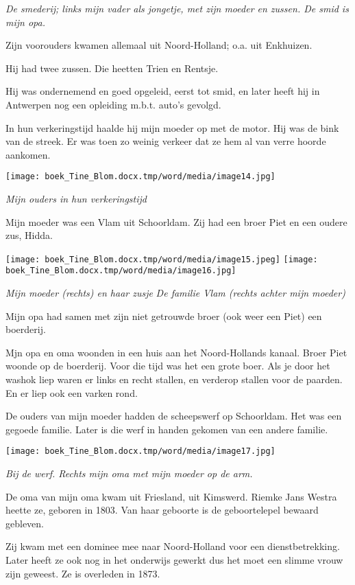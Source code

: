 \documentclass{scrbook}
\begin{document}
\textit{De smederij; links mijn vader als jongetje, met zijn moeder en zussen. De smid is mijn opa.}

Zijn voorouders kwamen allemaal uit Noord-Holland; o.a. uit Enkhuizen. 

Hij had twee zussen. Die heetten Trien en Rentsje.

Hij was ondernemend en goed opgeleid, eerst tot smid, en later heeft hij in Antwerpen nog een opleiding m.b.t. auto’s gevolgd.

In hun verkeringstijd haalde hij mijn moeder op met de motor. Hij was de bink van de streek. Er was toen zo weinig verkeer dat ze hem al van verre hoorde aankomen.

\texttt{[image: boek\_Tine\_Blom.docx.tmp/word/media/image14.jpg]}

\textit{Mijn ouders in hun verkeringstijd}

Mijn moeder was een Vlam uit Schoorldam. Zij had een broer Piet en een oudere zus, Hidda. 

\texttt{[image: boek\_Tine\_Blom.docx.tmp/word/media/image15.jpeg]}
\texttt{[image: boek\_Tine\_Blom.docx.tmp/word/media/image16.jpg]} 

\textit{Mijn moeder (rechts) en haar zusje}  \textit{De familie Vlam (rechts achter mijn moeder)}

Mijn opa had samen met zijn niet getrouwde broer (ook weer een Piet) een boerderij. 

Mjn opa en oma woonden in een huis aan het Noord-Hollands kanaal. Broer Piet woonde op de boerderij. Voor die tijd was het een grote boer. Als je door het washok liep waren er links en recht stallen, en verderop stallen voor de paarden. En er liep ook een varken rond.

De ouders van mijn moeder hadden de scheepswerf op Schoorldam. Het was een gegoede familie. Later is die werf in handen gekomen van een andere familie. 

\texttt{[image: boek\_Tine\_Blom.docx.tmp/word/media/image17.jpg]}

\textit{Bij de werf. Rechts mijn oma met mijn moeder op de arm.}

De oma van mijn oma kwam uit Friesland, uit Kimswerd. Riemke Jans Westra heette ze, geboren in 1803. Van haar geboorte is de geboortelepel bewaard gebleven. 

Zij kwam met een dominee mee naar Noord-Holland voor een dienstbetrekking. Later heeft ze ook nog in het onderwijs gewerkt dus het moet een slimme vrouw zijn geweest. Ze is overleden in 1873.
\end{document}
